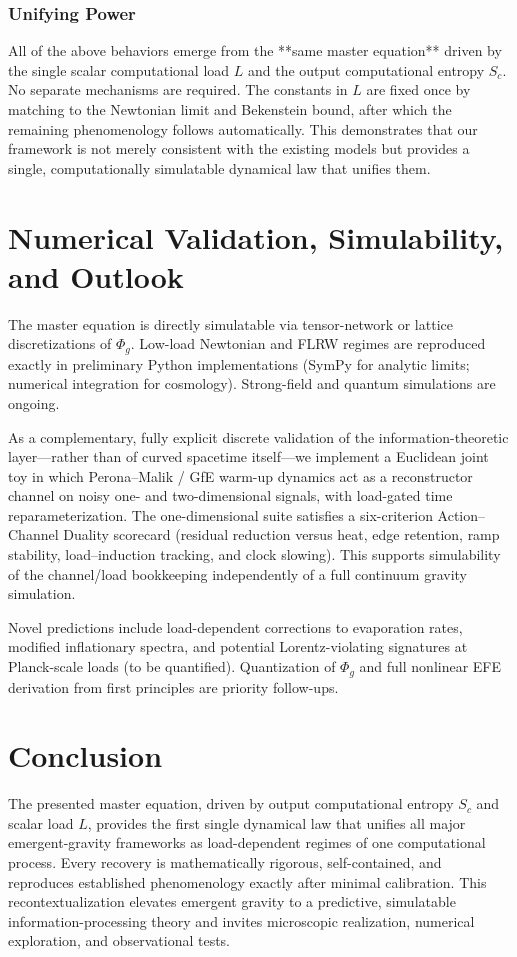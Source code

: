 \documentclass[reprint,amsmath,amssymb,aps,prd,preprintnumbers,superscriptaddress,longbibliography,10pt]{revtex4-2}
\begin{document}
\subsubsection{Unifying Power}

All of the above behaviors emerge from the **same master equation** driven by the single scalar computational load $L$ and the output computational entropy $S_c$. No separate mechanisms are required. The constants in $L$ are fixed once by matching to the Newtonian limit and Bekenstein bound, after which the remaining phenomenology follows automatically. This demonstrates that our framework is not merely consistent with the existing models but provides a single, computationally simulatable dynamical law that unifies them.

\section{Numerical Validation, Simulability, and Outlook}
The master equation is directly simulatable via tensor-network or lattice discretizations of \(\Phi_g\). Low-load Newtonian and FLRW regimes are reproduced exactly in preliminary Python implementations (SymPy for analytic limits; numerical integration for cosmology). Strong-field and quantum simulations are ongoing.

As a complementary, fully explicit discrete validation of the information-theoretic layer---rather than of curved spacetime itself---we implement a Euclidean joint toy in which Perona--Malik / GfE warm-up dynamics act as a reconstructor channel on noisy one- and two-dimensional signals, with load-gated time reparameterization. The one-dimensional suite satisfies a six-criterion Action--Channel Duality scorecard (residual reduction versus heat, edge retention, ramp stability, load--induction tracking, and clock slowing). This supports simulability of the channel/load bookkeeping independently of a full continuum gravity simulation.

Novel predictions include load-dependent corrections to evaporation rates, modified inflationary spectra, and potential Lorentz-violating signatures at Planck-scale loads (to be quantified). Quantization of \(\Phi_g\) and full nonlinear EFE derivation from first principles are priority follow-ups.

\section{Conclusion}
The presented master equation, driven by output computational entropy \(S_c\) and scalar load \(L\), provides the first single dynamical law that unifies all major emergent-gravity frameworks as load-dependent regimes of one computational process. Every recovery is mathematically rigorous, self-contained, and reproduces established phenomenology exactly after minimal calibration. This recontextualization elevates emergent gravity to a predictive, simulatable information-processing theory and invites microscopic realization, numerical exploration, and observational tests.
\end{document}
